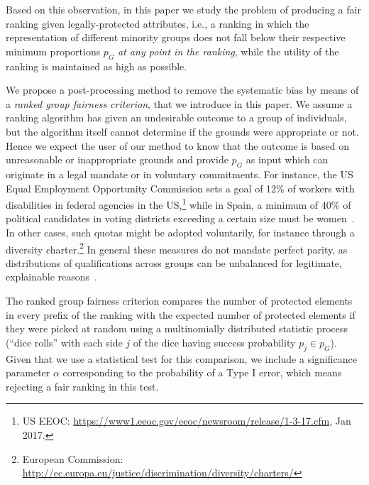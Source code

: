 Based on this observation, in this paper we study the problem of producing a fair ranking given legally-protected attributes, i.e., a ranking in which the representation of different minority groups does not fall below their respective minimum proportions $p_G$ \emph{at any point in the ranking}, while the utility of the ranking is maintained as high as possible.

We propose a post-processing method to remove the systematic bias by means of a \emph{ranked group fairness criterion}, that we introduce in this paper. We assume a ranking algorithm has given an undesirable outcome to a group of individuals, but the algorithm itself cannot determine if the grounds were appropriate or not. Hence we expect the user of our method to know that the outcome is based on unreasonable or inappropriate grounds and provide $p_G$ as input which can originate in a legal mandate or in voluntary commitments.
%
For instance, the US Equal Employment Opportunity Commission sets a goal of 12\% of workers with disabilities in federal agencies in the US,\footnote{US EEOC: \url{https://www1.eeoc.gov/eeoc/newsroom/release/1-3-17.cfm}, Jan 2017.}
%
while in Spain, a minimum of 40\% of political candidates in voting districts exceeding a certain size must be women~\cite{verge2010gendering}.
%
In other cases, such quotas might be adopted voluntarily, for instance through a diversity charter.\footnote{European Commission: \url{http://ec.europa.eu/justice/discrimination/diversity/charters/}}
%
In general these measures do not mandate perfect parity, as distributions of qualifications across groups can be unbalanced for legitimate, explainable reasons~\cite{zliobaite2011handling,pedreschi2009integrating}. %


The ranked group fairness criterion compares the number of protected elements in every prefix of the ranking with the expected number of protected elements if they were picked at random using a multinomially distributed statistic process (``dice rolls'' with each side $ j $ of the dice having success probability $p_j \in p_G$).
%
Given that we use a statistical test for this comparison, we include a significance parameter $\alpha$ corresponding to the probability of a Type I error, which means rejecting a fair ranking in this test.

